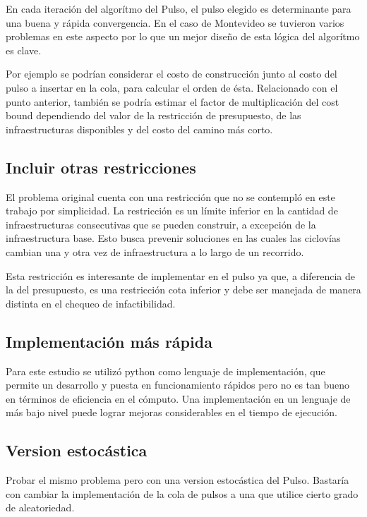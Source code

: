 \documentclass{article}
\begin{document}
  En cada iteración del algorítmo del Pulso, el pulso elegido es determinante para una buena y rápida convergencia. En el caso de Montevideo se tuvieron varios problemas en este aspecto por lo que un mejor diseño de esta lógica del algorítmo es clave.
  
  Por ejemplo se podrían considerar el costo de construcción junto al costo del pulso a insertar en la cola, para calcular el orden de ésta. Relacionado con el punto anterior, también se podría estimar el factor de multiplicación del cost bound dependiendo del valor de la restricción de presupuesto, de las infraestructuras disponibles y del costo del camino más corto.

  \subsection*{Incluir otras restricciones}

  El problema original cuenta con una restricción que no se contempló en este trabajo por simplicidad. La restricción es un límite inferior en la cantidad de infraestructuras consecutivas que se pueden construir, a excepción de la infraestructura base. Esto busca prevenir soluciones en las cuales las ciclovías cambian una y otra vez de infraestructura a lo largo de un recorrido.

  Esta restricción es interesante de implementar en el pulso ya que, a diferencia de la del presupuesto, es una restricción cota inferior y debe ser manejada de manera distinta en el chequeo de infactibilidad.

  \subsection*{Implementación más rápida}

  Para este estudio se utilizó python como lenguaje de implementación, que permite un desarrollo y puesta en funcionamiento rápidos pero no es tan bueno en términos de eficiencia en el cómputo. Una implementación en un lenguaje de más bajo nivel puede lograr mejoras considerables en el tiempo de ejecución.

  \subsection*{Version estocástica}

  Probar el mismo problema pero con una version estocástica del Pulso. Bastaría con cambiar la implementación de la cola de pulsos a una que utilice cierto grado de aleatoriedad.
\end{document}
